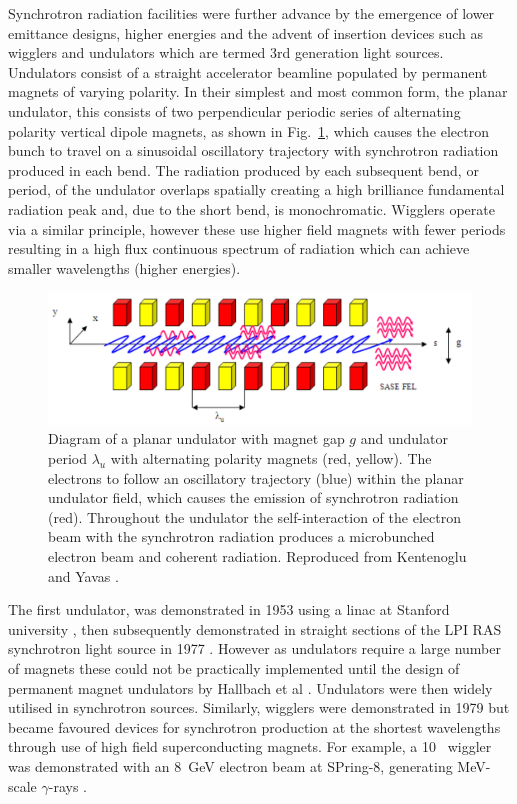 \documentclass[../main.tex]{subfiles}
\begin{document}
Synchrotron radiation facilities were further advance by the emergence of lower emittance designs, higher energies and the advent of insertion devices such as wigglers and undulators which are termed 3rd generation light sources. Undulators consist of a straight accelerator beamline populated by permanent magnets of varying polarity. In their simplest and most common form, the planar undulator, this consists of two perpendicular periodic series of alternating polarity vertical dipole magnets, as shown in Fig.~\ref{fig:planar_undulator}, which causes the electron bunch to travel on a sinusoidal oscillatory trajectory with synchrotron radiation produced in each bend. The radiation produced by each subsequent bend, or period, of the undulator overlaps spatially creating a high brilliance fundamental radiation peak and, due to the short bend, is monochromatic. Wigglers operate via a similar principle, however these use higher field magnets with fewer periods resulting in a high flux continuous spectrum of radiation which can achieve smaller wavelengths (higher energies). 

\begin{figure}[!h]
\centering
\includegraphics[width=\textwidth]{Figures/Introduction/Planar_Undulator.pdf}
\caption{Diagram of a planar undulator with magnet gap $g$ and undulator period $\lambda_{u}$ with alternating polarity magnets (red, yellow). The electrons to follow an oscillatory trajectory (blue) within the planar undulator field, which causes the emission of synchrotron radiation (red). Throughout the undulator the self-interaction of the electron beam with the synchrotron radiation produces a microbunched electron beam and coherent radiation. Reproduced from Kentenoglu and Yavas \cite{ketenoglu2010asynchronously}.}
\label{fig:planar_undulator}
\end{figure}

The first undulator, was demonstrated in 1953 using a linac at Stanford university \cite{motz1953experiments}, then subsequently demonstrated in straight sections of the LPI RAS synchrotron light source in 1977 \cite{bessonov2010light}.  However as undulators require a large number of magnets these could not be practically implemented until the design of permanent magnet undulators by Hallbach et al \cite{halbach1983permanent}. Undulators were then widely utilised in synchrotron sources. Similarly, wigglers were demonstrated in 1979 \cite{berndt1979initial} but became favoured devices for synchrotron production at the shortest wavelengths through use of high field superconducting magnets. For example, a 10~\si{\Tesla} wiggler was demonstrated with an 8~\si{\giga\electronvolt} electron beam at SPring-8, generating \si{\mega\electronvolt}-scale $\gamma$-rays \cite{soutome2003generation}.    
\end{document}
